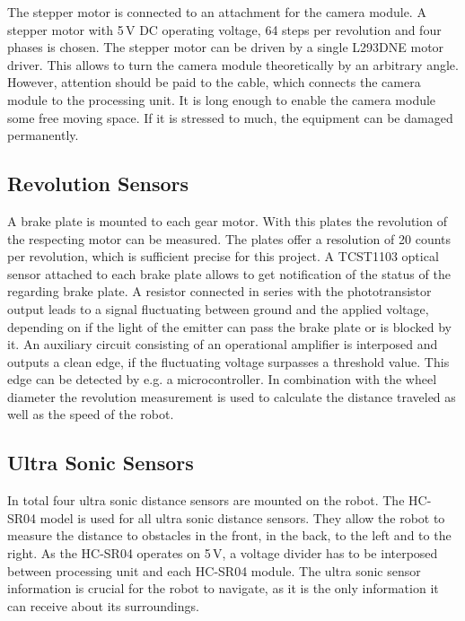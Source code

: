 The stepper motor is connected to an attachment for the camera module. A stepper motor with 5\,V DC operating voltage, 64 steps per revolution and four phases is chosen. The stepper motor can be driven by a single L293DNE \cite{l293dne} motor driver. This allows to turn the camera module theoretically by an arbitrary angle. However, attention should be paid to the cable, which connects the camera module to the processing unit. It is long enough to enable the camera module some free moving space. If it is stressed to much, the equipment can be damaged permanently. 

\subsection{Revolution Sensors}\label{subsec:revolution_sensor}

A brake plate is mounted to each gear motor. With this plates the revolution of the respecting motor can be measured. The plates offer a resolution of 20 counts per revolution, which is sufficient precise for this project. A TCST1103 \cite{tcst1103} optical sensor attached to each brake plate allows to get notification of the status of the regarding brake plate. A resistor connected in series with the phototransistor output leads to a signal fluctuating between ground and the applied voltage, depending on if the light of the emitter can pass the brake plate or is blocked by it. An auxiliary circuit consisting of an operational amplifier is interposed and outputs a clean edge, if the fluctuating voltage surpasses a threshold value. This edge can be detected by e.g. a microcontroller. In combination with the wheel diameter the revolution measurement is used to calculate the distance traveled as well as the speed of the robot.

\subsection{Ultra Sonic Sensors}\label{subsec:ultra_sonic_sensor}

In total four ultra sonic distance sensors are mounted on the robot. The HC-SR04 \cite{hc_sr04} model is used for all ultra sonic distance sensors. They allow the robot to measure the distance to obstacles in the front, in the back, to the left and to the right. As the HC-SR04 operates on 5\,V, a voltage divider has to be interposed between processing unit and each HC-SR04 module. The ultra sonic sensor information is crucial for the robot to navigate, as it is the only information it can receive about its surroundings.

